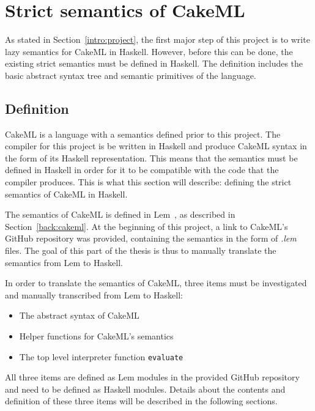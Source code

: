 \chapter{Strict semantics of CakeML}
\label{chapter:strict}
As stated in Section~\ref{intro:project}, the first major step of this project
is to write lazy semantics for CakeML in Haskell. However, before this can be
done, the existing strict semantics must be defined in Haskell. The definition
includes the basic abstract syntax tree and semantic primitives of the
language.

\section{Definition}
CakeML is a language with a semantics defined prior to this project.
The compiler for this project is be written in Haskell and produce CakeML
syntax in the form of its Haskell representation. This means that
the semantics must be defined in Haskell in order for it to be compatible with
the code that the compiler produces. This is
what this section will describe: defining the strict semantics of CakeML in
Haskell.

The semantics of CakeML is defined in Lem~\cite{Lem33:online}, as described in
Section~\ref{back:cakeml}. At the beginning of this project, a link to CakeML's
GitHub repository was provided, containing the semantics in the form
of \textit{.lem} files. The goal of this part of the thesis is thus to manually
translate the semantics from Lem to Haskell.

In order to translate the semantics of CakeML, three items must be
investigated and manually transcribed from Lem to Haskell:
\begin{itemize}
\item The abstract syntax of CakeML
\item Helper functions for CakeML's semantics
\item The top level interpreter function \texttt{evaluate}
\end{itemize}

\noindent All three items are defined as Lem modules in the provided GitHub
repository and need to be defined as Haskell modules.
Details about the contents and definition of these three items
will be described in the following sections.

